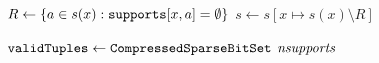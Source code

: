        \label{line:init:13}
         \STATE $R \leftarrow \left\{a \in s(x) : \texttt{supports}[x,a] = \emptyset\right\}$
         \STATE $s \leftarrow s[x \mapsto s(x) \setminus R]$ \label{line:init:14}
               \RETURN{$\emptyset$} \label{line:init:wipeout}
         \ENDIF

      \ENDFOREACH
      \STATE $\texttt{validTuples} \leftarrow \texttt{CompressedSparseBitSet}$  $\mathit{nsupports}$  \label{line:init:15}
